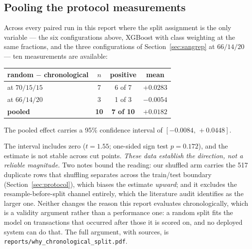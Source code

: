 \documentclass[11pt,a4paper]{article}
\newcommand{\code}[1]{\texttt{\small #1}}
\begin{document}
\subsection{Pooling the protocol measurements}\label{sec:pooled}
Across every paired run in this report where the split assignment is the only variable --- the
six configurations above, XGBoost with class weighting at the same fractions, and the three
configurations of Section~\ref{sec:sangrep} at $66/14/20$ --- ten measurements are available:

\begin{center}\small
\begin{tabular}{lccc}
      \toprule
      random $-$ chronological & $n$ & positive & mean\\
      \midrule
      at $70/15/15$ & 7 & 6 of 7 & $+0.0283$\\
      at $66/14/20$ & 3 & 1 of 3 & $-0.0054$\\
      \midrule
      \textbf{pooled} & \textbf{10} & \textbf{7 of 10} & $\mathbf{+0.0182}$\\
      \bottomrule
\end{tabular}
\end{center}

\noindent The pooled effect carries a 95\% confidence interval of $[-0.0084,\, +0.0448]$.

The interval includes zero ($t = 1.55$; one-sided sign test $p = 0.172$), and the estimate is
not stable across cut points. \emph{These data establish the direction, not a reliable
magnitude.} Two notes bound the reading: our shuffled arm carries the 517 duplicate rows that
shuffling separates across the train/test boundary (Section~\ref{sec:protocol}), which biases
the estimate \emph{upward}; and it excludes the resample-before-split channel entirely, which
the literature audit identifies as the larger one. Neither changes the reason this report
evaluates chronologically, which is a validity argument rather than a performance one: a random
split fits the model on transactions that occurred after those it is scored on, and no deployed
system can do that. The full argument, with sources, is
\code{reports/why\_chronological\_split.pdf}.
\end{document}
